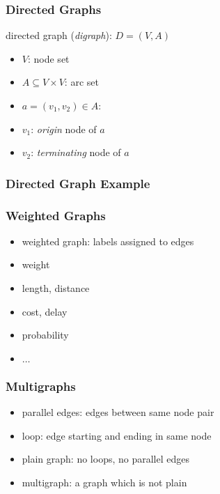 \documentclass[dvipsnames]{beamer}
\begin{document}
\begin{frame}
  \frametitle{Directed Graphs}

  \begin{definition}
    \alert{directed graph} (\emph{digraph}): $D=(V,A)$

    \begin{itemize}
      \item $V$: node set
      \item $A \subseteq V \times V$: \alert{arc} set
    \end{itemize}
  \end{definition}

  \begin{itemize}
    \item $a=(v_1,v_2) \in A$:
    \smallskip
    \item $v_1$: \emph{origin} node of $a$
    \item $v_2$: \emph{terminating} node of $a$
  \end{itemize}
\end{frame}

\begin{frame}
  \frametitle{Directed Graph Example}

  \begin{center}
  \end{center}
\end{frame}

\begin{frame}
  \frametitle{Weighted Graphs}

  \begin{itemize}
    \item weighted graph: labels assigned to edges

    \medskip
    \item weight
    \item length, distance
    \item cost, delay
    \item probability
    \item $\ldots$
  \end{itemize}
\end{frame}


\begin{frame}
  \frametitle{Multigraphs}

  \begin{itemize}
    \item \alert{parallel edges}: edges between same node pair
    \item \alert{loop}: edge starting and ending in same node

    \bigskip
    \item \alert{plain} graph: no loops, no parallel edges
    \item \alert{multigraph}: a graph which is not plain
  \end{itemize}
\end{frame}
\end{document}
